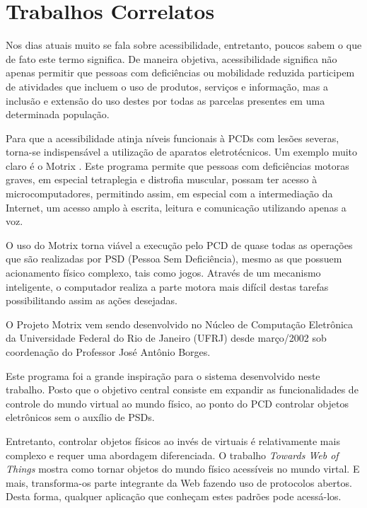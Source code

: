 \documentclass[12pt,a4paper,oneside]{report}
\begin{document}
\chapter{Trabalhos Correlatos}
\label{chap:trabalhos-correlatos}

Nos dias atuais muito se fala sobre acessibilidade, entretanto, poucos sabem o que de fato este termo significa. De maneira objetiva, acessibilidade significa não apenas permitir que pessoas com deficiências ou mobilidade reduzida participem de atividades que incluem o uso de produtos, serviços e informação, mas a inclusão e extensão do uso destes por todas as parcelas presentes em uma determinada população.

Para que a acessibilidade atinja níveis funcionais à PCDs com lesões severas, torna-se indispensável a utilização de aparatos eletrotécnicos. Um exemplo muito claro é o Motrix \cite{motrix}. Este programa permite que pessoas com deficiências motoras graves, em especial tetraplegia e distrofia muscular, possam ter acesso à microcomputadores, permitindo assim, em especial com a intermediação da Internet, um acesso amplo à escrita, leitura e comunicação utilizando apenas a voz.

O uso do Motrix torna viável a execução pelo PCD de quase todas as operações que são realizadas por PSD (Pessoa Sem Deficiência), mesmo as que possuem acionamento físico complexo, tais como jogos. Através de um mecanismo inteligente, o computador realiza a parte motora mais difícil destas tarefas possibilitando assim as ações desejadas.

O Projeto Motrix vem sendo desenvolvido no Núcleo de Computação Eletrônica da Universidade Federal do Rio de Janeiro (UFRJ) desde março/2002 sob coordenação do Professor José Antônio Borges.

Este programa foi a grande inspiração para o sistema desenvolvido neste trabalho. Posto que o objetivo central consiste em expandir as funcionalidades de controle do mundo virtual ao mundo físico, ao ponto do PCD controlar objetos eletrônicos sem o auxílio de PSDs.

Entretanto, controlar objetos físicos ao invés de virtuais é relativamente mais complexo e requer uma abordagem diferenciada. O trabalho \emph{Towards Web of Things} \cite{wotdovad} mostra como tornar objetos do mundo físico acessíveis no mundo virtal. E mais, transforma-os parte integrante da Web fazendo uso de protocolos abertos. Desta forma, qualquer aplicação que conheçam estes padrões pode acessá-los.
\end{document}
